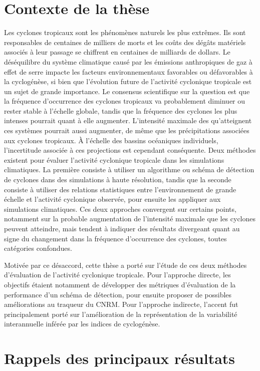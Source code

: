 \documentclass[../main.tex]{subfiles}
\begin{document}
\section*{Contexte de la thèse}

Les cyclones tropicaux sont les phénomènes naturels les plus extrêmes. Ils sont responsables de centaines de milliers de morts et les coûts des dégâts matériels
associés à leur passage se chiffrent en centaines de milliards de dollars. Le déséquilibre du système climatique causé par les émissions anthropiques de gaz à
effet de serre impacte les facteurs environnementaux favorables ou défavorables à la cyclogénèse, si bien que l'évolution future de l'activité cyclonique
tropicale est un sujet de grande importance. Le consensus scientifique sur la question est que la fréquence d'occurrence des cyclones tropicaux va probablement
diminuer ou rester stable à l'échelle globale, tandis que la fréquence des cyclones les plus intenses pourrait quant à elle augmenter. L'intensité maximale des
qu'atteignent ces systèmes pourrait aussi augmenter, de même que les précipitations associées aux cyclones tropicaux. À l'échelle des bassins océaniques
individuels, l'incertitude associée à ces projections est cependant conséquente. Deux méthodes existent pour évaluer l'activité cyclonique tropicale dans les
simulations climatiques. La première consiste à utiliser un algorithme ou schéma de détection de cyclones dans des simulations à haute résolution, tandis que la
seconde consiste à utiliser des relations statistiques entre l'environnement de grande échelle et l'activité cyclonique observée, pour ensuite les appliquer aux
simulations climatiques. Ces deux approches convergent sur certains points, notamment sur la probable augmentation de l'intensité maximale que les cyclones
peuvent atteindre, mais tendent à indiquer des résultats divergeant quant au signe du changement dans la fréquence d'occurrence des cyclones, toutes catégories
confondues.

Motivée par ce désaccord, cette thèse a porté sur l'étude de ces deux méthodes d'évaluation de l'activité cyclonique tropicale. Pour l'approche directe, les
objectifs étaient notamment de développer des métriques d'évaluation de la performance d'un schéma de détection, pour ensuite proposer de possibles
améliorations au traqueur du CNRM. Pour l'approche indirecte, l'accent fut principalement porté sur l'amélioration de la représentation de la variabilité
interannuelle inférée par les indices de cyclogénèse.

\section*{Rappels des principaux résultats}
\end{document}
